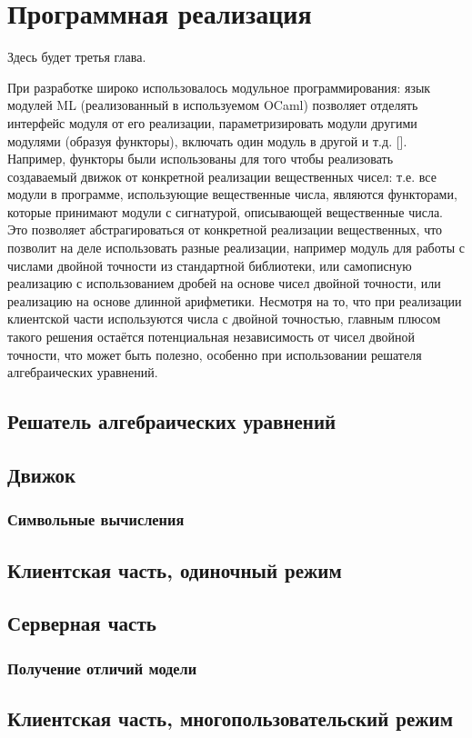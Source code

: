 \chapter{Программная реализация}

Здесь будет третья глава. \TODO

При разработке широко использовалось модульное программирования:
язык модулей ML (реализованный в используемом OCaml) позволяет отделять интерфейс модуля от его реализации,
параметризировать модули другими модулями (образуя функторы), включать один модуль в другой и т.д. [\TODO].
Например, функторы были использованы для того чтобы реализовать создаваемый движок от конкретной реализации
вещественных чисел: т.е. все модули в программе, использующие вещественные числа, являются функторами, которые принимают
модули с сигнатурой, описывающей вещественные числа. Это позволяет абстрагироваться от конкретной реализации вещественных,
что позволит на деле использовать разные реализации, например модуль для работы с числами двойной точности из стандартной библиотеки,
или самописную реализацию с использованием дробей на основе чисел двойной точности, или реализацию на основе длинной арифметики.
Несмотря на то, что при реализации клиентской части используются числа с двойной точностью,
главным плюсом такого решения остаётся потенциальная независимость от чисел двойной точности,
что может быть полезно, особенно при использовании решателя алгебраических уравнений.

\section{Решатель алгебраических уравнений}

\TODO

\section{Движок}\label{engine}

\TODO

\subsection{Символьные вычисления}\label{expr}

\TODO

\section{Клиентская часть, одиночный режим}

\TODO

\section{Серверная часть}

\subsection{Получение отличий модели}\label{model-diff-implementation}

\TODO

\section{Клиентская часть, многопользовательский режим}

\TODO
